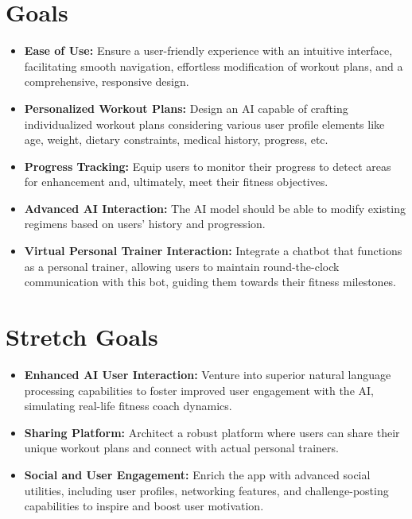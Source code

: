 \documentclass{article}
\begin{document}
    \section{Goals}

    \begin{itemize}
        \item \textbf{Ease of Use:} Ensure a user-friendly experience with an intuitive interface, facilitating smooth navigation, effortless modification of workout plans, and a comprehensive, responsive design.
        \item \textbf{Personalized Workout Plans:} Design an AI capable of crafting individualized workout plans considering various user profile elements like age, weight, dietary constraints, medical history, progress, etc.
        \item \textbf{Progress Tracking:} Equip users to monitor their progress to detect areas for enhancement and, ultimately, meet their fitness objectives.
        \item \textbf{Advanced AI Interaction:} The AI model should be able to modify existing regimens based on users' history and progression.
        \item \textbf{Virtual Personal Trainer Interaction:} Integrate a chatbot that functions as a personal trainer, allowing users to maintain round-the-clock communication with this bot, guiding them towards their fitness milestones.
    \end{itemize}

    \section{Stretch Goals}

    \begin{itemize}
        \item \textbf{Enhanced AI User Interaction:} Venture into superior natural language processing capabilities to foster improved user engagement with the AI, simulating real-life fitness coach dynamics.
        \item \textbf{Sharing Platform:} Architect a robust platform where users can share their unique workout plans and connect with actual personal trainers.
        \item \textbf{Social and User Engagement:} Enrich the app with advanced social utilities, including user profiles, networking features, and challenge-posting capabilities to inspire and boost user motivation.
    \end{itemize}
\end{document}
